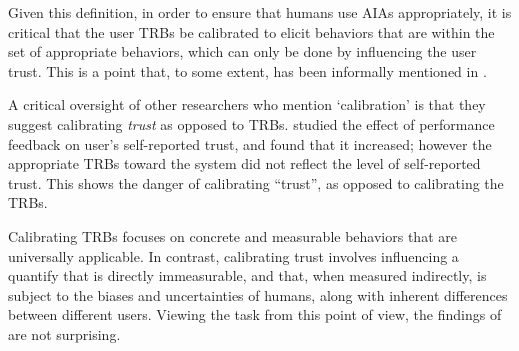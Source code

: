     Given this definition, in order to ensure that humans use AIAs appropriately, it is critical that the user TRBs be calibrated to elicit behaviors that are within the set of appropriate behaviors, which can only be done by influencing the user trust. This is a point that, to some extent, has been informally mentioned in \citet{Muir1994-ow,Muir1987-mk,Lillard2016-yg,Lee2004-pv,Hutchins2015-if}.

    A critical oversight of other researchers who mention `calibration' is that they suggest calibrating \emph{trust} as opposed to TRBs. \citet{Dzindolet2003-ts} studied the effect of performance feedback on user's self-reported trust, and found that it increased; however the appropriate TRBs toward the system did not reflect the level of self-reported trust. This shows the danger of calibrating ``trust'', as opposed to calibrating the TRBs.

    Calibrating TRBs focuses on concrete and measurable behaviors that are universally applicable. In contrast, calibrating trust involves influencing a quantify that is directly immeasurable, and that, when measured indirectly, is subject to the biases and uncertainties of humans, along with inherent differences between different users. Viewing the task from this point of view, the findings of \citeauthor{Dzindolet2003-ts} are not surprising.


